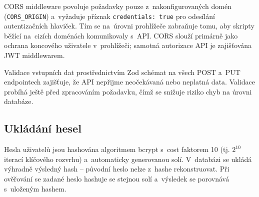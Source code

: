 CORS middleware povoluje požadavky pouze z~nakonfigurovaných domén (\texttt{CORS\-\_ORIGIN}) a~vyžaduje příznak \texttt{credentials:\allowbreak{} true} pro odesílání autentizačních hlaviček. Tím se na~úrovni prohlížeče zabraňuje tomu, aby skripty běžící na~cizích doménách komunikovaly s~API. CORS slouží primárně jako ochrana koncového uživatele v~prohlížeči; samotná autorizace API je zajišťována JWT middlewarem.

Validace vstupních dat prostřednictvím Zod schémat na všech POST a~PUT endpointech zajišťuje, že API nepřijme neočekávaná nebo neplatná data. Validace probíhá ještě před zpracováním požadavku, čímž se snižuje riziko chyb na úrovni databáze.

\subsection{Ukládání hesel}

Hesla uživatelů jsou hashována algoritmem bcrypt s~cost faktorem 10 (tj. $2^{10}$ iterací klíčového rozvrhu) a~automaticky generovanou solí. V~databázi se ukládá výhradně výsledný hash -- původní heslo nelze z~hashe rekonstruovat. Při ověřování se zadané heslo hashuje se stejnou solí a~výsledek se porovnává s~uloženým hashem.
